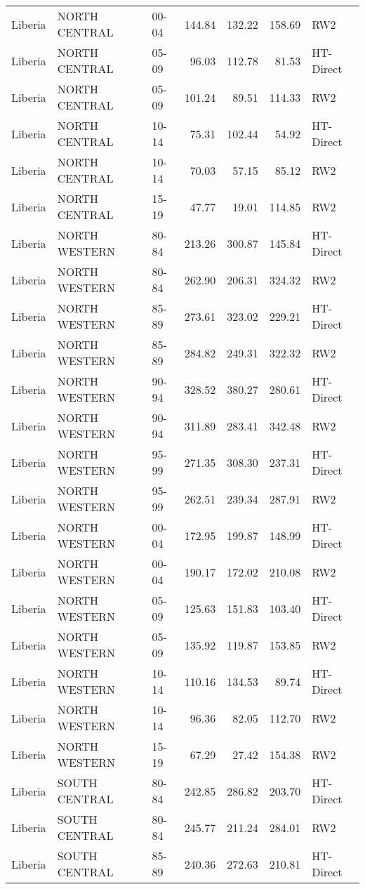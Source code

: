 \begin{longtable}{lllrrrl}
  Liberia & NORTH CENTRAL & 00-04 & 144.84 & 132.22 & 158.69 & RW2 \\ 
  Liberia & NORTH CENTRAL & 05-09 & 96.03 & 112.78 & 81.53 & HT-Direct \\ 
  Liberia & NORTH CENTRAL & 05-09 & 101.24 & 89.51 & 114.33 & RW2 \\ 
  Liberia & NORTH CENTRAL & 10-14 & 75.31 & 102.44 & 54.92 & HT-Direct \\ 
  Liberia & NORTH CENTRAL & 10-14 & 70.03 & 57.15 & 85.12 & RW2 \\ 
  Liberia & NORTH CENTRAL & 15-19 & 47.77 & 19.01 & 114.85 & RW2 \\ 
  Liberia & NORTH WESTERN & 80-84 & 213.26 & 300.87 & 145.84 & HT-Direct \\ 
  Liberia & NORTH WESTERN & 80-84 & 262.90 & 206.31 & 324.32 & RW2 \\ 
  Liberia & NORTH WESTERN & 85-89 & 273.61 & 323.02 & 229.21 & HT-Direct \\ 
  Liberia & NORTH WESTERN & 85-89 & 284.82 & 249.31 & 322.32 & RW2 \\ 
  Liberia & NORTH WESTERN & 90-94 & 328.52 & 380.27 & 280.61 & HT-Direct \\ 
  Liberia & NORTH WESTERN & 90-94 & 311.89 & 283.41 & 342.48 & RW2 \\ 
  Liberia & NORTH WESTERN & 95-99 & 271.35 & 308.30 & 237.31 & HT-Direct \\ 
  Liberia & NORTH WESTERN & 95-99 & 262.51 & 239.34 & 287.91 & RW2 \\ 
  Liberia & NORTH WESTERN & 00-04 & 172.95 & 199.87 & 148.99 & HT-Direct \\ 
  Liberia & NORTH WESTERN & 00-04 & 190.17 & 172.02 & 210.08 & RW2 \\ 
  Liberia & NORTH WESTERN & 05-09 & 125.63 & 151.83 & 103.40 & HT-Direct \\ 
  Liberia & NORTH WESTERN & 05-09 & 135.92 & 119.87 & 153.85 & RW2 \\ 
  Liberia & NORTH WESTERN & 10-14 & 110.16 & 134.53 & 89.74 & HT-Direct \\ 
  Liberia & NORTH WESTERN & 10-14 & 96.36 & 82.05 & 112.70 & RW2 \\ 
  Liberia & NORTH WESTERN & 15-19 & 67.29 & 27.42 & 154.38 & RW2 \\ 
  Liberia & SOUTH CENTRAL & 80-84 & 242.85 & 286.82 & 203.70 & HT-Direct \\ 
  Liberia & SOUTH CENTRAL & 80-84 & 245.77 & 211.24 & 284.01 & RW2 \\ 
  Liberia & SOUTH CENTRAL & 85-89 & 240.36 & 272.63 & 210.81 & HT-Direct \\ 

\end{longtable}

